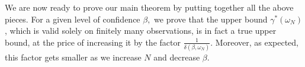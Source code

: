 \begin{remark}
We are now ready to prove our main theorem by putting together all the above pieces. For a given level of confidence $\beta,$ we prove that the upper bound $\gamma^{*}(\omega_N)$, which is valid solely on finitely many observations, is in fact a true upper bound, at the price of increasing it by the factor $\frac{1}{\delta(\beta, \omega_N)}$. Moreover, as expected, this factor gets smaller as we increase $N$ and decrease $\beta$.
\end{remark}
%
%
%
